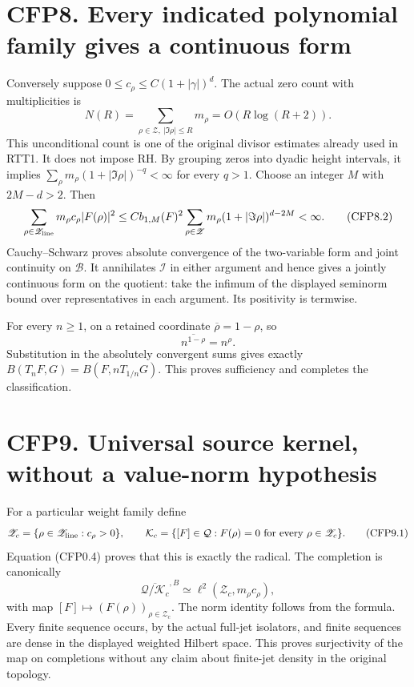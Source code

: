 \section{CFP8. Every indicated polynomial family gives a continuous
form}\label{cfp8.-every-indicated-polynomial-family-gives-a-continuous-form}

Conversely suppose \(0\le c_\rho\le C(1+|\gamma|)^d\). The actual zero
count with multiplicities is \[
N(R)=\sum_{\rho\in\mathscr Z,\ |\Im\rho|\le R}m_\rho
=O(R\log(R+2)).
\tag{CFP8.1}
\] This unconditional count is one of the original divisor estimates
already used in RTT1. It does not impose RH. By grouping zeros into
dyadic height intervals, it implies
\(\sum_\rho m_\rho(1+|\Im\rho|)^{-q}<\infty\) for every \(q>1\). Choose
an integer \(M\) with \(2M-d>2\). Then \[
\sum_{\rho\in\mathscr Z_{\rm line}}
m_\rho c_\rho |F(\rho)|^2
\le C b_{1,M}(F)^2
\sum_{\rho\in\mathscr Z}m_\rho(1+|\Im\rho|)^{d-2M}<\infty.
\tag{CFP8.2}
\] Cauchy--Schwarz proves absolute convergence of the two-variable form
and joint continuity on \(\mathcal B\). It annihilates \(\mathcal I\) in
either argument and hence gives a jointly continuous form on the
quotient: take the infimum of the displayed seminorm bound over
representatives in each argument. Its positivity is termwise.

For every \(n\ge1\), on a retained coordinate \(\overline\rho=1-\rho\),
so \[
\overline{n^{1-\rho}}=n^\rho.
\] Substitution in the absolutely convergent sums gives exactly
\(B(T_nF,G)=B(F,nT_{1/n}G)\). This proves sufficiency and completes the
classification.

\section{CFP9. Universal source kernel, without a value-norm
hypothesis}\label{cfp9.-universal-source-kernel-without-a-value-norm-hypothesis}

For a particular weight family define \[
\mathscr Z_c=\{\rho\in\mathscr Z_{\rm line}:c_\rho>0\},
\qquad
\mathcal K_c=\{[F]\in\mathcal Q:F(\rho)=0\text{ for every }\rho\in\mathscr Z_c\}.
\tag{CFP9.1}
\] Equation (CFP0.4) proves that this is exactly the radical. The
completion is canonically \[
\overline{\mathcal Q/\mathcal K_c}^{,B}
\simeq\ell^2(\mathscr Z_c,m_\rho c_\rho),
\tag{CFP9.2}
\] with map \([F]\mapsto(F(\rho))_{\rho\in\mathscr Z_c}\). The norm
identity follows from the formula. Every finite sequence occurs, by the
actual full-jet isolators, and finite sequences are dense in the
displayed weighted Hilbert space. This proves surjectivity of the map on
completions without any claim about finite-jet density in the original
topology.

